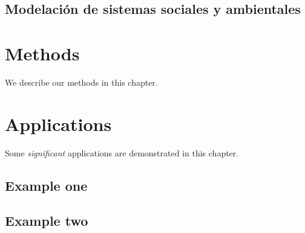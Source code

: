 \documentclass[
]{book}
\begin{document}
\hypertarget{modelaciuxf3n-de-sistemas-sociales-y-ambientales}{%
\section{Modelación de sistemas sociales y ambientales}\label{modelaciuxf3n-de-sistemas-sociales-y-ambientales}}

\hypertarget{methods}{%
\chapter{Methods}\label{methods}}

We describe our methods in this chapter.

\hypertarget{applications}{%
\chapter{Applications}\label{applications}}

Some \emph{significant} applications are demonstrated in this chapter.

\hypertarget{example-one}{%
\section{Example one}\label{example-one}}

\hypertarget{example-two}{%
\section{Example two}\label{example-two}}

  
\end{document}
